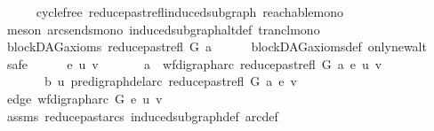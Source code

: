 \begin{isabellebody}
\ \ \ \ \isamarkupfalse%
\ cycle{\isacharunderscore}{\kern0pt}free\ reduce{\isacharunderscore}{\kern0pt}past{\isacharunderscore}{\kern0pt}refl{\isacharunderscore}{\kern0pt}induced{\isacharunderscore}{\kern0pt}subgraph\ reachable{\isacharunderscore}{\kern0pt}mono\isanewline
\ \ \ \ \isamarkupfalse%
\ {\isacharparenleft}{\kern0pt}meson\ arcs{\isacharunderscore}{\kern0pt}ends{\isacharunderscore}{\kern0pt}mono\ induced{\isacharunderscore}{\kern0pt}subgraph{\isacharunderscore}{\kern0pt}altdef\ trancl{\isacharunderscore}{\kern0pt}mono{\isacharparenright}{\kern0pt}\ \isanewline
{}\isamarkupfalse%
\isanewline
\ \ \isamarkupfalse%
\ {\isachardoublequoteopen}blockDAG{\isacharunderscore}{\kern0pt}axioms\ {\isacharparenleft}{\kern0pt}reduce{\isacharunderscore}{\kern0pt}past{\isacharunderscore}{\kern0pt}refl\ G\ a{\isacharparenright}{\kern0pt}{\isachardoublequoteclose}\isanewline
\ \ \ \ \isamarkupfalse%
\ blockDAG{\isacharunderscore}{\kern0pt}axioms{\isacharunderscore}{\kern0pt}def\ only{\isacharunderscore}{\kern0pt}new{\isacharunderscore}{\kern0pt}alt\isanewline
\ \ \isamarkupfalse%
\ safe\isanewline
\ \ \ \ \isamarkupfalse%
\ e\ u\ v\ \isanewline
\ \ \ \ \isamarkupfalse%
\ a{\isacharcolon}{\kern0pt}\ {\isachardoublequoteopen}\ wf{\isacharunderscore}{\kern0pt}digraph{\isachardot}{\kern0pt}arc\ {\isacharparenleft}{\kern0pt}reduce{\isacharunderscore}{\kern0pt}past{\isacharunderscore}{\kern0pt}refl\ G\ a{\isacharparenright}{\kern0pt}\ e\ {\isacharparenleft}{\kern0pt}u{\isacharcomma}{\kern0pt}\ v{\isacharparenright}{\kern0pt}{\isachardoublequoteclose}\isanewline
\ \ \ \ \ \ \ b{\isacharcolon}{\kern0pt}\ {\isachardoublequoteopen}u\ {\isasymrightarrow}\isactrlsup {\isacharplus}{\kern0pt}\isactrlbsub pre{\isacharunderscore}{\kern0pt}digraph{\isachardot}{\kern0pt}del{\isacharunderscore}{\kern0pt}arc\ {\isacharparenleft}{\kern0pt}reduce{\isacharunderscore}{\kern0pt}past{\isacharunderscore}{\kern0pt}refl\ G\ a{\isacharparenright}{\kern0pt}\ e\isactrlesub \ v{\isachardoublequoteclose}\isanewline
\ \ \ \ \isamarkupfalse%
\ edge{\isacharcolon}{\kern0pt}\ {\isachardoublequoteopen}wf{\isacharunderscore}{\kern0pt}digraph{\isachardot}{\kern0pt}arc\ G\ e\ {\isacharparenleft}{\kern0pt}u{\isacharcomma}{\kern0pt}\ v{\isacharparenright}{\kern0pt}{\isachardoublequoteclose}\isanewline
\ \ \ \ \ \ \isamarkupfalse%
\ assms\ reduce{\isacharunderscore}{\kern0pt}past{\isacharunderscore}{\kern0pt}arcs{}\ induced{\isacharunderscore}{\kern0pt}subgraph{\isacharunderscore}{\kern0pt}def\ arc{\isacharunderscore}{\kern0pt}def\ \isanewline

\end{isabellebody}
